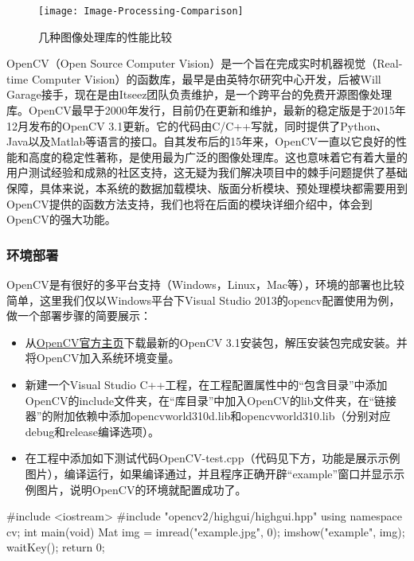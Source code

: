 \begin{figure}
	\centering
	\texttt{[image: Image-Processing-Comparison]}
	\caption{几种图像处理库的性能比较}
	\label{pic:image-processing-comparison}
\end{figure}

OpenCV（Open Source Computer Vision）是一个旨在完成实时机器视觉（Real-time Computer Vision）的函数库，最早是由英特尔研究中心开发，后被Will Garage接手，现在是由Itseez团队负责维护，是一个跨平台的免费开源图像处理库\citep{wiki:OpenCV}。OpenCV最早于2000年发行，目前仍在更新和维护，最新的稳定版是于2015年12月发布的OpenCV 3.1更新。它的代码由C/C++写就，同时提供了Python、Java以及Matlab等语言的接口\citep{wiki:OpenCV}。自其发布后的15年来，OpenCV一直以它良好的性能和高度的稳定性著称，是使用最为广泛的图像处理库。这也意味着它有着大量的用户测试经验和成熟的社区支持，这无疑为我们解决项目中的棘手问题提供了基础保障，具体来说，本系统的数据加载模块、版面分析模块、预处理模块都需要用到OpenCV提供的函数方法支持，我们也将在后面的模块详细介绍中，体会到OpenCV的强大功能。

\subsubsection{环境部署}
OpenCV是有很好的多平台支持（Windows，Linux，Mac等），环境的部署也比较简单，这里我们仅以Windows平台下Visual Studio 2013的opencv配置使用为例，做一个部署步骤的简要展示：
\begin{itemize}
  \item 从\href{http://opencv.org/}{OpenCV官方主页}下载最新的OpenCV 3.1安装包，解压安装包完成安装。并将OpenCV加入系统环境变量。
  \item 新建一个Visual Studio C++工程，在工程配置属性中的“包含目录”中添加OpenCV的include文件夹，在“库目录”中加入OpenCV的lib文件夹，在“链接器”的附加依赖中添加opencvworld310d.lib和opencvworld310.lib（分别对应debug和release编译选项）。
  \item 在工程中添加如下测试代码OpenCV-test.cpp（代码见下方，功能是展示示例图片），编译运行，如果编译通过，并且程序正确开辟“example”窗口并显示示例图片，说明OpenCV的环境就配置成功了。
\end{itemize}

\begin{Codex}[label=OpenCV-test.cpp, numbers=left]
#include <iostream>
#include "opencv2/highgui/highgui.hpp"
using namespace cv;
int main(void)
{
  Mat img = imread("example.jpg", 0);
  imshow("example", img);
  waitKey();
  return 0;
}
\end{Codex}


